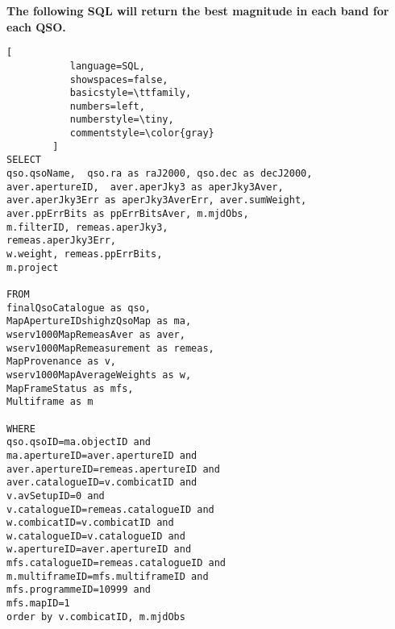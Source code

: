 \lstset{upquote=true}

\noindent
{\bf The following SQL will return 
the best magnitude in each band for each QSO.}


\begin{lstlisting}[
           language=SQL,
           showspaces=false,
           basicstyle=\ttfamily,
           numbers=left,
           numberstyle=\tiny,
           commentstyle=\color{gray}
        ]
SELECT 
qso.qsoName,  qso.ra as raJ2000, qso.dec as decJ2000, 
aver.apertureID,  aver.aperJky3 as aperJky3Aver, 
aver.aperJky3Err as aperJky3AverErr, aver.sumWeight, 
aver.ppErrBits as ppErrBitsAver, m.mjdObs, 
m.filterID, remeas.aperJky3, 
remeas.aperJky3Err, 
w.weight, remeas.ppErrBits, 
m.project

FROM 
finalQsoCatalogue as qso,  
MapApertureIDshighzQsoMap as ma,  
wserv1000MapRemeasAver as aver,  
wserv1000MapRemeasurement as remeas,  
MapProvenance as v,  
wserv1000MapAverageWeights as w, 
MapFrameStatus as mfs, 
Multiframe as m  

WHERE 
qso.qsoID=ma.objectID and 
ma.apertureID=aver.apertureID and 
aver.apertureID=remeas.apertureID and 
aver.catalogueID=v.combicatID and 
v.avSetupID=0 and 
v.catalogueID=remeas.catalogueID and 
w.combicatID=v.combicatID and 
w.catalogueID=v.catalogueID and 
w.apertureID=aver.apertureID and 
mfs.catalogueID=remeas.catalogueID and 
m.multiframeID=mfs.multiframeID and 
mfs.programmeID=10999 and 
mfs.mapID=1 
order by v.combicatID, m.mjdObs
\end{lstlisting}

